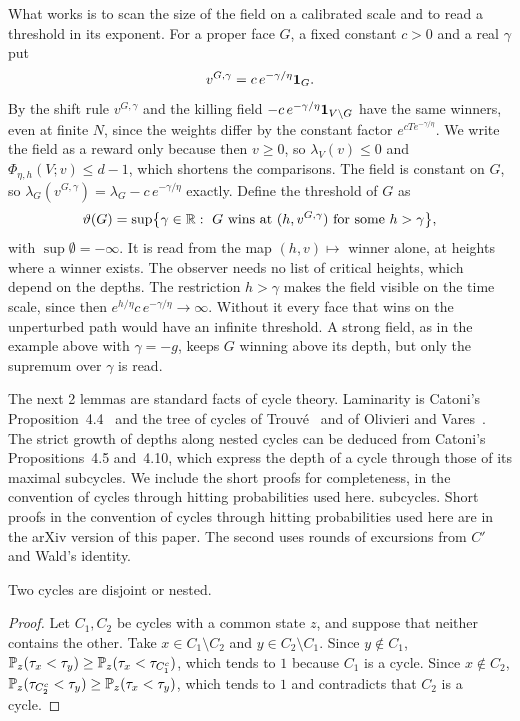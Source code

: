 What works is to scan the size of the field on a calibrated scale and to read a
threshold in its exponent. For a proper face $G$, a fixed constant $c>0$ and a
real $\gamma$ put
\[
 v^{G,\gamma}=c\,e^{-\gamma/\eta}\mathbf{1}_G .
\]
By the shift rule $v^{G,\gamma}$ and the killing field
$-c\,e^{-\gamma/\eta}\mathbf{1}_{V\setminus G}$ have the same winners, even at finite
$N$, since the weights differ by the constant factor $e^{cTe^{-\gamma/\eta}}$. We
write the field as a reward only because then $v\ge0$, so $\lambda_V(v)\le0$ and
$\Phi_{\eta,h}(V;v)\le d-1$, which shortens the comparisons. The field is constant
on $G$, so $\lambda_G(v^{G,\gamma})=\lambda_G-c\,e^{-\gamma/\eta}$ exactly. Define
the threshold of $G$ as
\[
 \vartheta(G)=\sup\bigl\{\gamma\in\R:\ G\text{ wins at }(h,v^{G,\gamma})\text{ for some }h>\gamma\bigr\},
\]
with $\sup\emptyset=-\infty$. It is read from the map $(h,v)\mapsto$ winner alone,
at heights where a winner exists. The observer needs no list of critical
heights, which depend on the depths. The restriction $h>\gamma$ makes the field
visible on the time scale, since then $e^{h/\eta}c\,e^{-\gamma/\eta}\to\infty$.
Without it every face that wins on the unperturbed path would have an infinite
threshold. A strong field, as in the example above with $\gamma=-g$, keeps $G$
winning above its depth, but only the supremum over $\gamma$ is read.

The next 2 lemmas are standard facts of cycle theory. Laminarity is Catoni's
Proposition~4.4~\cite{catoni1999} and the tree of cycles of
Trouv\'e~\cite{trouve1996} and of Olivieri and Vares~\cite[Chapter~6]{olivierivares2005}.
The strict growth of depths along nested cycles can be deduced from Catoni's
Propositions~4.5 and~4.10, which express the depth of a cycle through those of its maximal
\ifarxivbuild
subcycles. We include the short proofs for completeness, in the convention of
cycles through hitting probabilities used here.
\else
subcycles. Short proofs in the convention of cycles through hitting probabilities used
here are in the arXiv version of this paper. The second uses rounds of excursions from $C'$ and
Wald's identity.
\fi

\begin{lemma}[laminarity]\label{lem:laminar}
Two cycles are disjoint or nested.
\end{lemma}

\ifarxivbuild
\begin{proof}
Let $C_1,C_2$ be cycles with a common state $z$, and suppose that neither
contains the other. Take $x\in C_1\setminus C_2$ and $y\in C_2\setminus C_1$. Since
$y\notin C_1$, $\mathbb{P}_z(\tau_x<\tau_y)\ge\mathbb{P}_z(\tau_x<\tau_{C_1^c})$, which
tends to $1$ because $C_1$ is a cycle. Since $x\notin C_2$,
$\mathbb{P}_z(\tau_{C_2^c}<\tau_y)\ge\mathbb{P}_z(\tau_x<\tau_y)$, which tends to $1$ and
contradicts that $C_2$ is a cycle.
\end{proof}
\else

